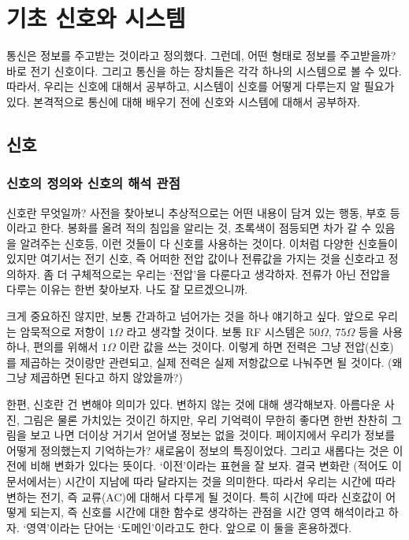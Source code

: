 \chapter{기초 신호와 시스템}
통신은 정보를 주고받는 것이라고 정의했다. 그런데, 어떤 형태로 정보를 주고받을까?
바로 전기 신호이다. 그리고 통신을 하는 장치들은 각각 하나의 시스템으로 볼 수 있다.
따라서, 우리는 신호에 대해서 공부하고, 시스템이 신호를 어떻게 다루는지 알 필요가 있다.
본격적으로 통신에 대해 배우기 전에 신호와 시스템에 대해서 공부하자.

\section{신호}
\subsection{신호의 정의와 신호의 해석 관점}
신호란 무엇일까? 사전을 찾아보니 추상적으로는 어떤 내용이 담겨 있는 행동, 부호 등이라고 한다.
봉화를 올려 적의 침입을 알리는 것, 초록색이 점등되면 차가 갈 수 있음을 알려주는 신호등, 이런 것들이 다 신호를 사용하는 것이다.
이처럼 다양한 신호들이 있지만 여기서는 전기 신호, 즉 어떠한 전압 값이나 전류값을 가지는 것을 신호라고 정의하자.
좀 더 구체적으로는 우리는 `전압'을 다룬다고 생각하자. 전류가 아닌 전압을 다루는 이유는 한번 찾아보자. 나도 잘 모르겠으니까.
\par
크게 중요하진 않지만, 보통 간과하고 넘어가는 것을 하나 얘기하고 싶다. 앞으로 우리는 암묵적으로 저항이 $1 \Omega$ 라고 생각할 것이다.
보통 RF 시스템은 $50 \Omega$, $75 \Omega$ 등을 사용하나, 편의를 위해서 $1 \Omega$ 이란 값을 쓰는 것이다.
이렇게 하면 전력은 그냥 전압(신호)를 제곱하는 것이랑만 관련되고, 실제 전력은 실제 저항값으로 나눠주면 될 것이다.
(왜 그냥 제곱하면 된다고 하지 않았을까?)
\par
한편, 신호란 건 변해야 의미가 있다.
변하지 않는 것에 대해 생각해보자.
아름다운 사진, 그림은 물론 가치있는 것이긴 하지만, 우리 기억력이 무한히 좋다면 한번 찬찬히 그림을 보고 나면 더이상 거기서 얻어낼 정보는 없을 것이다.
\pageref{정보}페이지에서 우리가 정보를 어떻게 정의했는지 기억하는가? 새로움이 정보의 특징이었다. 그리고 새롭다는 것은 이전에 비해 변화가 있다는 뜻이다.
`이전'이라는 표현을 잘 보자. 결국 변화란 (적어도 이 문서에서는) 시간이 지남에 따라 달라지는 것을 의미한다.
따라서 우리는 시간에 따라 변하는 전기, 즉 교류(AC)에 대해서 다루게 될 것이다. 
특히 시간에 따라 신호값이 어떻게 되는지, 즉 신호를 시간에 대한 함수로 생각하는 관점을 시간 영역 해석이라고 하자. `영역'이라는 단어는 `도메인'이라고도 한다. 앞으로 이 둘을 혼용하겠다.

